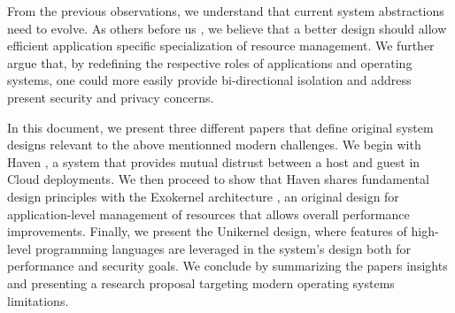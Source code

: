 From the previous observations, we understand that current system abstractions need to evolve.
As others before us \cite{DBLP:conf/sosp/EnglerKO95,DBLP:conf/hotos/EnglerK95,DBLP:conf/sosp/KaashoekEGBHMPGM97,DBLP:journals/tocs/CaoFKL96,DBLP:journals/sigops/HartyC92}, we believe that a better design should allow efficient application specific specialization of resource management.
We further argue that, by redefining the respective roles of applications and operating systems, one could more easily provide bi-directional isolation and address present security and privacy concerns.

In this document, we present three different papers that define original system designs relevant to the above mentionned modern challenges.
We begin with Haven \cite{DBLP:journals/tocs/BaumannPH15}, a system that provides mutual distrust between a host and guest in Cloud deployments.
We then proceed to show that Haven shares fundamental design principles with the Exokernel architecture \cite{DBLP:conf/sosp/EnglerKO95}, an original design for application-level management of resources that allows overall performance improvements.
Finally, we present the Unikernel \cite{DBLP:conf/asplos/MadhavapeddyMRSSGSHC13} design, where features of high-level programming languages are leveraged in the system's design both for performance and security goals.
We conclude by summarizing the papers insights and presenting a research proposal targeting modern operating systems limitations.